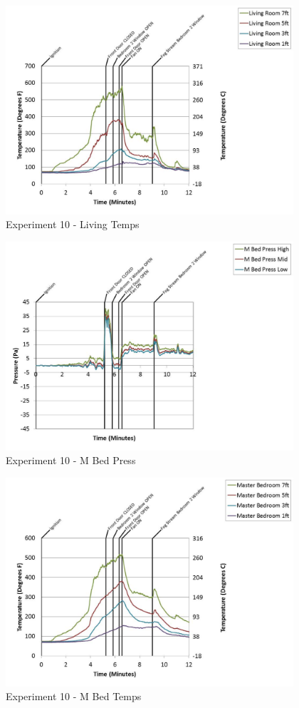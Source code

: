 \documentclass{article}
\begin{document}
\begin{appendices}
	\clearpage

	\begin{figure}[h!]
		\centering
		\includegraphics[height=3.05in]{0_Images/Results_Charts/Exp_10_Charts/LivingTemps.pdf}
		\caption{Experiment 10 - Living Temps}
	\end{figure}
 

	\begin{figure}[h!]
		\centering
		\includegraphics[height=3.05in]{0_Images/Results_Charts/Exp_10_Charts/MBedPress.pdf}
		\caption{Experiment 10 - M Bed Press}
	\end{figure}
 
	\clearpage

	\begin{figure}[h!]
		\centering
		\includegraphics[height=3.05in]{0_Images/Results_Charts/Exp_10_Charts/MBedTemps.pdf}
		\caption{Experiment 10 - M Bed Temps}
	\end{figure}
 


\end{appendices}
\end{document}
